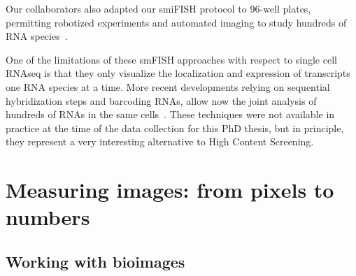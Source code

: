 Our collaborators also adapted our smiFISH protocol to 96-well plates, permitting robotized experiments and automated imaging to study hundreds of RNA species~\cite{tsanov_smifish_2016, safieddine_choreography_2021}.

One of the limitations of these smFISH approaches with respect to single cell RNAseq is that they only visualize the localization and expression of transcripts one RNA species at a time. More recent developments relying on sequential hybridization steps and barcoding RNAs, allow now the joint analysis of hundreds of \ac{RNA}s in the same cells~\cite{lubeck_single_cell_2014, Chen_2015, eng_seqfish_2019, fazalAtlasSubcellularRNA2019}. These techniques were not available in practice at the time of the data collection for this PhD thesis, but in principle, they represent a very interesting alternative to High Content Screening.









\section{Measuring images: from pixels to numbers}
\label{sec:computation_biology}

\subsection{Working with bioimages}
\label{subsec:intro_bioimages}

